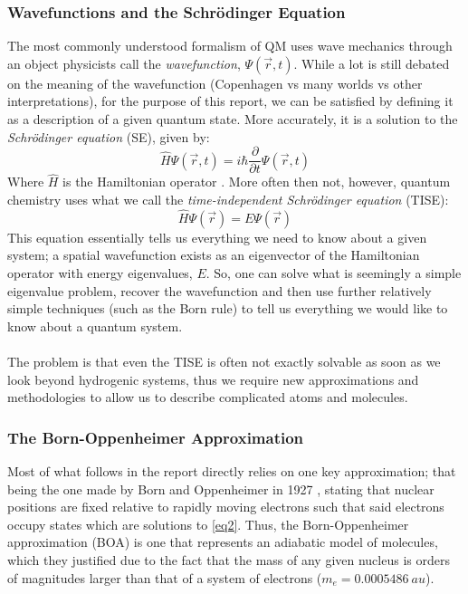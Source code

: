 \documentclass{article}
\begin{document}
\subsubsection{Wavefunctions and the Schr\"odinger Equation}
The most commonly understood formalism of QM uses wave mechanics through an object physicists call the \emph{wavefunction}, $\Psi(\vec{r},t)$. While a lot is still debated on the meaning of the wavefunction (Copenhagen vs many worlds vs other interpretations), for the purpose of this report, we can be satisfied by defining it as a description of a given quantum state. More accurately, it is a solution to the \emph{Schr\"odinger equation} (SE), given by:
\begin{equation}
    \hat{H} \Psi(\vec{r},t) = i\hbar \frac{\partial}{\partial t}\Psi(\vec{r},t)
    \label{eq1}
\end{equation}
Where $\hat{H}$ is the Hamiltonian operator \cite{sakurai2020modern}. More often then not, however, quantum chemistry uses what we call the \emph{time-independent Schr\"odinger equation} (TISE):
\begin{equation}
    \hat{H}\Psi(\vec{r}) = E\Psi(\vec{r})
    \label{eq2}
\end{equation}
This equation essentially tells us everything we need to know about a given system; a spatial wavefunction exists as an eigenvector of the Hamiltonian operator with energy eigenvalues, $E$. So, one can solve what is seemingly a simple eigenvalue problem, recover the wavefunction and then use further relatively simple techniques (such as the Born rule) to tell us everything we would like to know about a quantum system.
\\ \\ 
The problem is that even the TISE is often not exactly solvable as soon as we look beyond hydrogenic systems, thus we require new approximations and methodologies to allow us to describe complicated atoms and molecules. 

\subsubsection{The Born-Oppenheimer Approximation}
Most of what follows in the report directly relies on one key approximation; that being the one made by Born and Oppenheimer in 1927 \cite{Born1927}, stating that nuclear positions are fixed relative to rapidly moving electrons such that said electrons occupy states which are solutions to \cref{eq2}. Thus, the Born-Oppenheimer approximation (BOA) is one that represents an adiabatic model of molecules, which they justified due to the fact that the mass of any given nucleus is orders of magnitudes larger than that of a system of electrons ($m_e = 0.0005486 \ au$). 
\end{document}
